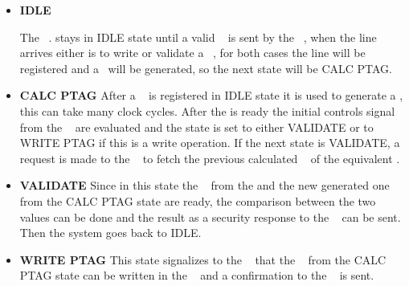 \begin{itemize}
  \item{\textbf{IDLE}}
 
The  \seceng~. stays in  IDLE  state until a valid \sline~ is sent by the \handler~, when the line arrives either is to write or validate a \ptag~, for both cases the line will be registered  and a \ptag~will be generated, so the next state will be CALC PTAG. 
 
  \item{\textbf{CALC PTAG}}
  After a \sline~ is registered in IDLE state it is used to generate a \ptag, this can take many clock cycles. After the \ptag is ready the initial controls signal from the \handler~ are evaluated and the state is set to  either VALIDATE or to WRITE PTAG if this is a write operation. If the next state is  VALIDATE, a request is made to the \pmmu~ to fetch the previous calculated  \ptag~ of the equivalent \sline.
  

  \item{\textbf{VALIDATE}}
  Since in this state the \ptag~ from the \ptagmem and the new generated one from the CALC PTAG state are ready, the comparison between  the two values  can be done and the result as a security response to the \handler~ can be sent. Then  the system goes back to IDLE.
  

 \item{\textbf{WRITE PTAG}}
  This state  signalizes to the \pmmu~  that the \ptag~ from the CALC PTAG state can be written in the \ptagmem~ and a  confirmation to the \handler~ is sent.
\end{itemize}


